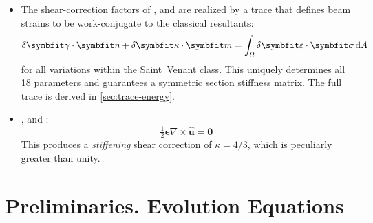 \begin{itemize}
    \item The shear-correction factors of \cite{krenk1985pretwist}, \cite{renton1991generalized} and \cite{romano1992shear} are realized by a trace that defines beam strains to be 
    work-conjugate to the classical resultants:
    \begin{equation}
    \delta\bm{\gamma} \cdot \bm{n} + \delta\bm{\kappa} \cdot \bm{m} 
    = \int_\Section \delta\bm{\varepsilon} \cdot \bm{\sigma} \, \mathrm{d}A
    \label{eq:def-trace-conjugate}
    \end{equation}
    for all variations within the Saint~Venant class.
    This uniquely determines all 18 
    parameters and guarantees a symmetric section stiffness matrix. The full trace is derived in \cref{sec:trace-energy}. 
    \item
    \cite[Eq. (7.4.52)]{slaughter2013linearized}, and \cite{reddy2002energy}:
    \[
    \tfrac12 \bm{\epsilon}\nabla\times\hat{\bm u}= \mathbf{0}
    \]
    This produces a \emph{stiffening} shear correction of \(\kappa = 4/3\), which is peculiarly greater than unity. 
\end{itemize}



\section{Preliminaries. Evolution Equations}\label{sec:uniform-evolution}

